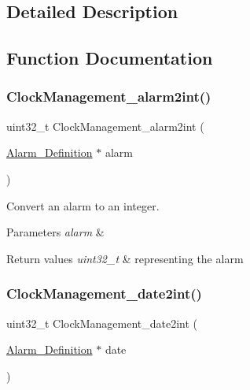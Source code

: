 \subsection{Detailed Description}


\subsection{Function Documentation}
\mbox{\label{group___clock___management_ga6e567ef31c1220b3440ca3f726f86d10}} 
\subsubsection{\texorpdfstring{Clock\+Management\+\_\+alarm2int()}{ClockManagement\_alarm2int()}}
{\footnotesize\ttfamily uint32\+\_\+t Clock\+Management\+\_\+alarm2int (\begin{DoxyParamCaption}\item[{\hyperlink{struct_alarm___definition}{Alarm\+\_\+\+Definition} $\ast$}]{alarm }\end{DoxyParamCaption})}



Convert an alarm to an integer. 


\begin{DoxyParams}{Parameters}
{\em alarm} & \\
\hline
\end{DoxyParams}

\begin{DoxyRetVals}{Return values}
{\em uint32\+\_\+t} & representing the alarm \\
\hline
\end{DoxyRetVals}
\mbox{\label{group___clock___management_ga9e3b465b980b97aa4477ac3574b5cfba}} 
\subsubsection{\texorpdfstring{Clock\+Management\+\_\+date2int()}{ClockManagement\_date2int()}}
{\footnotesize\ttfamily uint32\+\_\+t Clock\+Management\+\_\+date2int (\begin{DoxyParamCaption}\item[{\hyperlink{struct_alarm___definition}{Alarm\+\_\+\+Definition} $\ast$}]{date }\end{DoxyParamCaption})}



